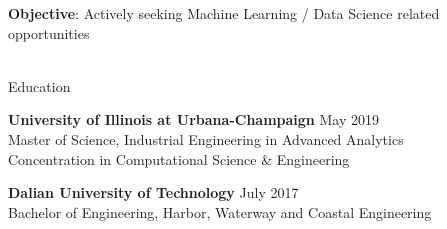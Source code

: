 \documentclass{resume} %
\begin{document}





\textbf{Objective}: Actively seeking Machine Learning / Data Science related opportunities\\
\\
\begin{rSection}{Education}



{\bf University of Illinois at Urbana-Champaign} \hfill {May 2019}
\\ 
Master of Science, Industrial Engineering in Advanced Analytics %
\\
Concentration in Computational Science \& Engineering

{\bf Dalian University of Technology} \hfill {July 2017}
\\ 
Bachelor of Engineering, Harbor, Waterway and Coastal Engineering %

\end{rSection}
\end{document}
